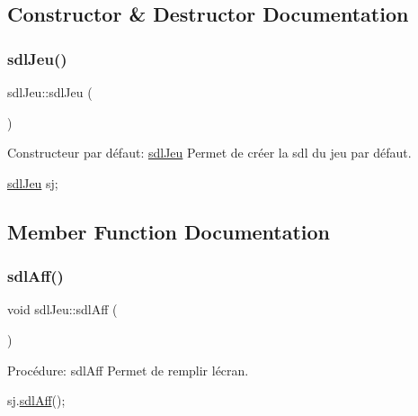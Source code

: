 \subsection{Constructor \& Destructor Documentation}
\mbox{\label{classsdlJeu_a06ba2075a4b592f6d0a2e268c29a044e}} 
\subsubsection{\texorpdfstring{sdl\+Jeu()}{sdlJeu()}}
{\footnotesize\ttfamily sdl\+Jeu\+::sdl\+Jeu (\begin{DoxyParamCaption}{ }\end{DoxyParamCaption})}



Constructeur par défaut\+: \hyperlink{classsdlJeu}{sdl\+Jeu} Permet de créer la sdl du jeu par défaut. 


\begin{DoxyCode}
\hyperlink{classsdlJeu}{sdlJeu} sj;
\end{DoxyCode}
 

\subsection{Member Function Documentation}
\mbox{\label{classsdlJeu_aedada55e3f96ba37493664d358dc7b60}} 
\subsubsection{\texorpdfstring{sdl\+Aff()}{sdlAff()}}
{\footnotesize\ttfamily void sdl\+Jeu\+::sdl\+Aff (\begin{DoxyParamCaption}{ }\end{DoxyParamCaption})}



Procédure\+: sdl\+Aff Permet de remplir l\textquotesingle{}écran. 


\begin{DoxyCode}
sj.\hyperlink{classsdlJeu_aedada55e3f96ba37493664d358dc7b60}{sdlAff}();
\end{DoxyCode}
 \mbox{\label{classsdlJeu_a5628835d7efcab056985c3aa3de56836}} 
